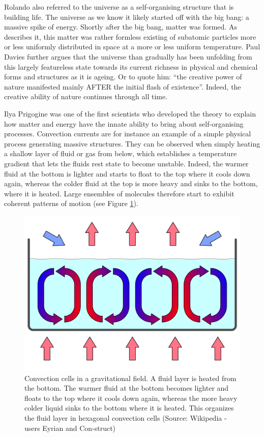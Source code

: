 \documentclass[
  11pt,
]{book}
\begin{document}
Rolando also referred to the universe as a self-organising structure that is building life. The universe as we know it likely started off with the big bang: a massive spike of energy. Shortly after the big bang, matter was formed. As \citet{davies1987} describes it, this matter was rather formless existing of subatomic particles more or less uniformly distributed in space at a more or less uniform temperature.
Paul Davies further argues that the universe than gradually has been unfolding from this largely featureless state towards its current richness in physical and chemical forms and structures as it is ageing. Or to quote him: ``the creative power of nature manifested mainly AFTER the initial flash of existence''. Indeed, the creative ability of nature continues through all time.

Ilya Prigogine was one of the first scientists who developed the theory to explain how matter and energy have the innate ability to bring about self-organising processes. Convection currents are for instance an example of a simple physical process generating massive structures. They can be observed when simply heating a shallow layer of fluid or gas from below, which establishes a temperature gradient that lets the fluids rest state to become unstable. Indeed, the warmer fluid at the bottom is lighter and starts to float to the top where it cools down again, whereas the colder fluid at the top is more heavy and sinks to the bottom, where it is heated. Large ensembles of molecules therefore start to exhibit coherent patterns of motion (see Figure \ref{fig:convectionCells}).

\begin{figure}

{\centering \includegraphics[width=0.8\linewidth]{./figs/convection_cells} 

}

\caption{Convection cells in a gravitational field. A fluid layer is heated from the bottom. The warmer fluid at the bottom becomes lighter and floats to the top where it cools down again, whereas the more heavy colder liquid sinks to the bottom where it is heated. This organizes the fluid layer in hexagonal convection cells (Source: Wikipedia - users Eyrian and Con-struct)}\label{fig:convectionCells}
\end{figure}
\end{document}
